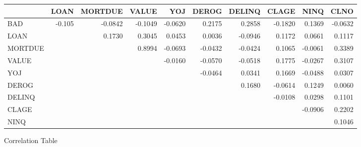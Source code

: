 \begin{appendices}
\begin{landscape}
\begin{figure}[ht]
	\centering
	\renewcommand{\arraystretch}{2}
	\begin{tabular}{lrrrrrrrrr}
		\toprule
		{} &   LOAN &  MORTDUE &   VALUE &     YOJ &   DEROG &  DELINQ &   CLAGE &    NINQ &    CLNO \\
		\midrule
		BAD       & -0.105 &  -0.0842 & -0.1049 & -0.0620 &  0.2175 &  0.2858 & -0.1820 &  0.1369 & -0.0632 \\
		LOAN       &     &   0.1730 &  0.3045 &  0.0453 &  0.0036 & -0.0946 &  0.1172 &  0.0661 &  0.1117 \\
		MORTDUE   &     &       &  0.8994 & -0.0693 & -0.0432 & -0.0424 &  0.1065 & -0.0061 &  0.3389 \\
		VALUE      &     &       &      & -0.0160 & -0.0570 & -0.0518 &  0.1775 & -0.0267 &  0.3107 \\
		YOJ        &     &       &      &      & -0.0464 &  0.0341 &  0.1669 & -0.0488 &  0.0307 \\
		DEROG      &     &       &      &      &      &  0.1680 & -0.0614 &  0.1249 &  0.0060 \\
		DELINQ     &     &       &      &      &      &      & -0.0108 &  0.0298 &  0.1101 \\
		CLAGE      &     &       &      &      &      &      &      & -0.0906 &  0.2202 \\
		NINQ       &     &       &      &      &      &      &      &      &  0.1046 \\
		\bottomrule
	\end{tabular}
	\caption{Correlation Table \label{CORR_TBL}}
\end{figure}
\end{landscape}


\end{appendices}

